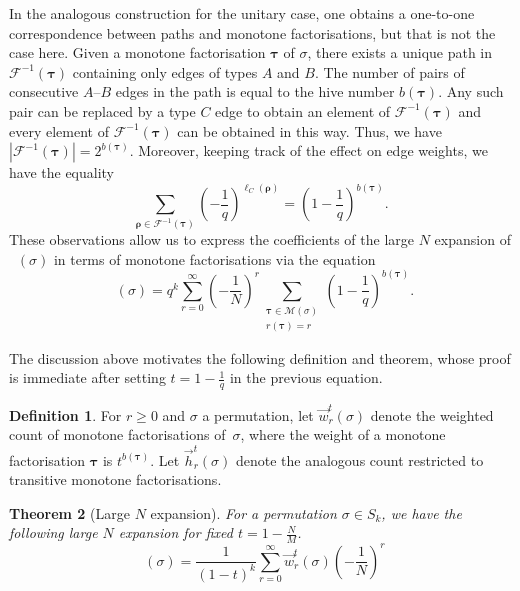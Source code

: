 \documentclass[a4paper]{article}
\theoremstyle{plain}
\newtheorem{theorem}{Theorem}
\numberwithin{theorem}{section}
\theoremstyle{definition}
\newtheorem{definition}[theorem]{Definition}
\theoremstyle{remark}
\renewcommand{\geq}{\geqslant}
\newcommand{\SM}{\mathbf{S}}			%
\DeclareMathOperator{\SW}{Wg^{\SM}}		%
\newcommand{\SG}{S} 					%
\newcommand{\dhn}[2]{\vec{w}^{t}_{#1}(#2)}
\newcommand{\hn}[2]{\vec{h}^{t}_{#1}(#2)}
\begin{document}
In the analogous construction for the unitary case, one obtains a one-to-one correspondence between paths and monotone factorisations, but that is not the case here. Given a monotone factorisation $\bm{\tau}$ of $\sigma$, there exists a unique path in $\mathcal{F}^{-1}(\bm{\tau})$ containing only edges of types $A$ and $B$. The number of pairs of consecutive $A$--$B$ edges in the path is equal to the hive number $b(\bm{\tau})$. Any such pair can be replaced by a type $C$ edge to obtain an element of $\mathcal{F}^{-1}(\bm{\tau})$ and every element of $\mathcal{F}^{-1}(\bm{\tau})$ can be obtained in this way. Thus, we have $|\mathcal{F}^{-1}(\bm{\tau})| = 2^{b(\bm{\tau})}$. Moreover, keeping track of the effect on edge weights, we have the equality
\[
\sum_{\bm{\rho} \in \mathcal{F}^{-1}(\bm{\tau})} \left(-\frac{1}{q}\right)^{\ell_C(\bm{\rho})} = \left(1 -\frac{1}{q}\right)^{b(\bm{\tau})}.
\]
These observations allow us to express the coefficients of the large $N$ expansion of $\SW(\sigma)$ in terms of monotone factorisations via the equation
\[
\SW(\sigma) = q^k \sum_{r=0}^\infty \left( -\frac{1}{N} \right)^r \sum_{\substack{\bm{\tau} \in \mathcal{M}(\sigma) \\ r(\bm{\tau}) = r }} \left( 1 -\frac{1}{q} \right)^{b(\bm{\tau})}.
\]


The discussion above motivates the following definition and theorem, whose proof is immediate after setting $t = 1 - \frac{1}{q}$ in the previous equation.


\begin{definition} \label{def:weightedcount}
For $r \geq 0$ and $\sigma$ a permutation, let $\dhn{r}{\sigma}$ denote the weighted count of monotone factorisations of~$\sigma$, where the weight of a monotone factorisation $\bm{\tau}$ is $t^{b(\bm{\tau})}$. Let $\hn{r}{\sigma}$ denote the analogous count restricted to transitive monotone factorisations.
\end{definition}


\begin{theorem} [Large $N$ expansion] \label{thm:fixTexpansion}
For a permutation $\sigma \in \SG_k$, we have the following large $N$ expansion for fixed $t = 1 - \frac{N}{M}$.
\begin{equation}
\label{eq:fixTexpansion}
\SW(\sigma) = \frac{1}{(1-t)^k} \sum_{r=0}^\infty \dhn{r}{\sigma} \left( -\frac{1}{N} \right)^r
\end{equation}
\end{theorem}
\end{document}
